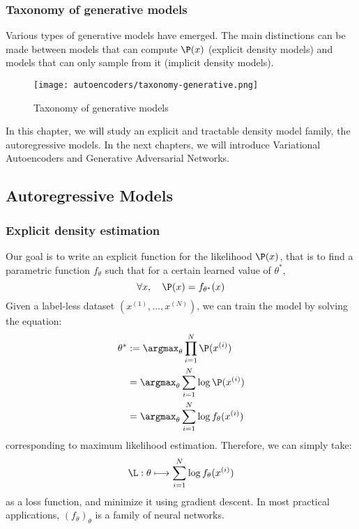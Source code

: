 \subsubsection{Taxonomy of generative models}
Various types of generative models have emerged. The main distinctions can be made between models that can compute $\P(x)$ (explicit density models) and models that can only sample from it (implicit density models).
\begin{figure}[H]
    \centering
    \texttt{[image: autoencoders/taxonomy-generative.png]} 
    \caption{Taxonomy of generative models}
\end{figure}
In this chapter, we will study an explicit and tractable density model family, the autoregressive models. In the next chapters, we will introduce Variational Autoencoders and Generative Adversarial Networks. 

\subsection{Autoregressive Models}
\subsubsection{Explicit density estimation}
Our goal is to write an explicit function for the likelihood $\P(x)$, that is to find a parametric function $f_\theta$ such that for a certain learned value of $\theta^*$,
\begin{equation*}
    \forall x,\quad \P(x) = f_{\theta^*}(x)
\end{equation*}
Given a label-less dataset $(x^{(1)}, \dots, x^{(N)})$, we can train the model by solving the equation:
\begin{equation*}
    \begin{aligned}
        \theta^* &:= \argmax_\theta \prod_{i=1}^N \P(x^{(i)})\\
        &= \argmax_\theta \sum_{i=1}^N \log\P(x^{(i)})\\
        &= \argmax_\theta \sum_{i=1}^N \log f_\theta(x^{(i)})
    \end{aligned}
\end{equation*}
corresponding to maximum likelihood estimation. Therefore, we can simply take:
\begin{equation*}
    \L : \theta \longmapsto \sum_{i=1}^N \log f_\theta(x^{(i)})
\end{equation*}
as a loss function, and minimize it using gradient descent. In most practical applications, $\left(f_\theta\right)_\theta$ is a family of neural networks.

